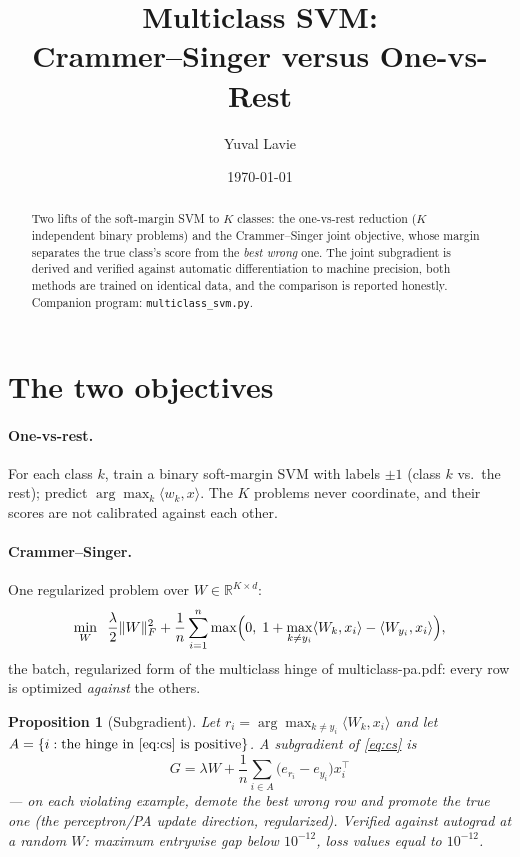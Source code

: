 \documentclass[11pt]{article}
\title{Multiclass SVM:\\ Crammer--Singer versus One-vs-Rest}
\author{Yuval Lavie}
\date{\today}
\newtheorem{proposition}{Proposition}
\theoremstyle{remark}
\begin{document}
\maketitle

\begin{abstract}
Two lifts of the soft-margin SVM to $K$ classes: the one-vs-rest
reduction ($K$ independent binary problems) and the Crammer--Singer
joint objective, whose margin separates the true class's score from
the \emph{best wrong} one. The joint subgradient is derived and
verified against automatic differentiation to machine precision, both
methods are trained on identical data, and the comparison is reported
honestly. Companion program: \texttt{multiclass\_svm.py}.
\end{abstract}

\section{The two objectives}

\paragraph{One-vs-rest.} For each class $k$, train a binary
soft-margin SVM with labels $\pm1$ (class $k$ vs.\ the rest); predict
$\arg\max_k \langle w_k, x\rangle$. The $K$ problems never
coordinate, and their scores are not calibrated against each other.

\paragraph{Crammer--Singer.} One regularized problem over
$W \in \mathbb{R}^{K \times d}$:
\begin{equation}
  \min_W \;\; \frac{\lambda}{2}\|W\|_F^2
  + \frac1n \sum_{i=1}^{n}
  \max\Bigl(0,\; 1 + \max_{k \ne y_i} \langle W_k, x_i\rangle
  - \langle W_{y_i}, x_i\rangle\Bigr),
  \label{eq:cs}
\end{equation}
the batch, regularized form of the multiclass hinge of
multiclass-pa.pdf: every row is optimized \emph{against} the others.

\begin{proposition}[Subgradient]
Let $r_i = \arg\max_{k \ne y_i}\langle W_k, x_i\rangle$ and let
$A = \{i : \text{the hinge in \eqref{eq:cs} is positive}\}$. A
subgradient of \eqref{eq:cs} is
\begin{equation}
  \boxed{\;G = \lambda W + \frac1n \sum_{i \in A}
  \bigl(e_{r_i} - e_{y_i}\bigr) x_i^{\!\top}\;}
  \label{eq:grad}
\end{equation}
--- on each violating example, demote the best wrong row and promote
the true one (the perceptron/PA update direction, regularized).
Verified against autograd at a random $W$: maximum entrywise gap
below $10^{-12}$, loss values equal to $10^{-12}$.
\end{proposition}
\end{document}
